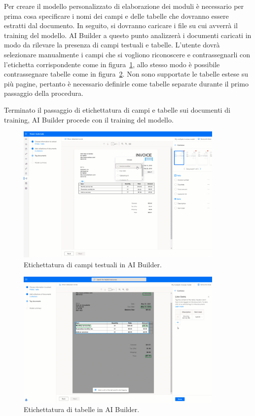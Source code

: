 Per creare il modello personalizzato di elaborazione dei moduli è necessario per prima cosa specificare i nomi dei campi e delle tabelle che dovranno essere estratti dal documento.
In seguito, si dovranno caricare i file su cui avverrà il training del modello. AI Builder a questo punto analizzerà i documenti caricati in modo da rilevare la presenza di campi testuali e tabelle.
L'utente dovrà  selezionare manualmente i campi che si vogliono riconoscere e contrassegnarli con l'etichetta corrispondente come in figura~\ref{fig:aiBuilderFields}, allo stesso modo è possibile contrassegnare tabelle come in figura~\ref{fig:aiBuilderTables}. Non sono supportate le tabelle estese su più pagine, pertanto è necessario definirle come tabelle separate durante il primo passaggio della procedura.

Terminato il passaggio di etichettatura di campi e tabelle sui documenti di training, AI Builder procede con il training del modello.

\begin{figure}[ht!]
  \centering
  \includegraphics[width=0.9\textwidth]{ai-builder-fields.png}
  \caption{Etichettatura di campi testuali in AI Builder.}
  \label{fig:aiBuilderFields}
\end{figure}

\begin{figure}[ht!]
  \centering
  \includegraphics[width=0.9\textwidth]{ai-builder-tables.png}
  \caption{Etichettatura di tabelle in AI Builder.}
  \label{fig:aiBuilderTables}
\end{figure}

